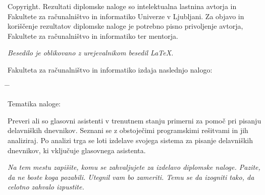 \documentclass[a4paper, 12pt]{book}
\newcommand{\clearemptydoublepage}{\newpage{\pagestyle{empty}\cleardoublepage}}
\begin{document}
\noindent
{\sc Copyright}. 
Rezultati diplomske naloge so intelektualna lastnina avtorja in Fakultete za računalništvo in informatiko Univerze v Ljubljani.
Za objavo in koriščenje rezultatov diplomske naloge je potrebno pisno privoljenje avtorja, Fakultete za računalništvo in informatiko ter mentorja.

\begin{center}
\mbox{}\vfill
\emph{Besedilo je oblikovano z urejevalnikom besedil \LaTeX.}
\end{center}
\clearemptydoublepage

\thispagestyle{empty}
\vspace*{4cm}

\noindent
Fakulteta za računalništvo in informatiko izdaja naslednjo nalogo:
\medskip
\begin{tabbing}
\hspace{32mm}\= \hspace{6cm} \= \kill




Tematika naloge:
\end{tabbing}
Preveri ali so glasovni asistenti v trenutnem stanju primerni za pomoč pri pisanju delavniških dnevnikov.
Seznani se z obstoječimi programskimi rešitvami in jih analiziraj.
Po analizi trga se loti izdelave svojega sistema za pisanje delavniških dnevnikov, ki vključuje glasovnega asistenta.
\vspace{15mm}



\vspace{2cm}

\clearemptydoublepage

\thispagestyle{empty}\mbox{}\vfill\null\it%
\noindent
Na tem mestu zapišite, komu se zahvaljujete za izdelavo diplomske naloge. Pazite, da ne boste koga pozabili. Utegnil vam bo zameriti. Temu se da izogniti tako, da celotno zahvalo izpustite.
\rm\normalfont

\clearemptydoublepage

\thispagestyle{empty}\mbox{}{\textheight}\mbox{}\hfill\begin{minipage}{0.55\textwidth}%
\normalfont\end{minipage}
\end{document}

